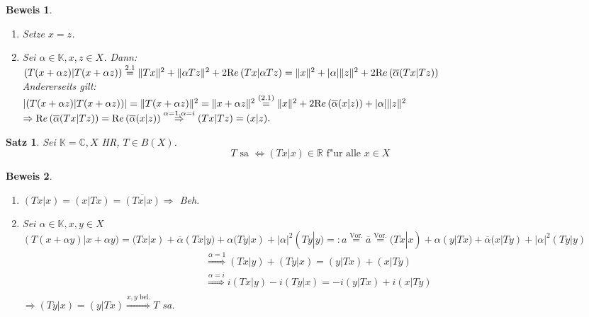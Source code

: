 \documentclass[a4paper,11pt]{book}
\newcommand{\R}{{\mathbb R}}
\newcommand{\C}{{\mathbb C}}
\newcommand{\K}{{\mathbb K}}
\newcommand{\re}{\ensuremath{\text Re}\,}
\newtheorem{Sa}[Def]{Satz}
\theoremstyle{nonumberplain}
\newtheorem{Bew}{Beweis}
\begin{document}
\begin{Bew}
\begin{enumerate}
\item["` $\Leftarrow$ "´] Setze $x = z$.

\item["` $\Rightarrow$ "´] Sei $\alpha \in \K, x,z \in X$. Dann:\\
$(T(x+\alpha z)|T(x+\alpha z)) \stackrel{2.1}{=} \|Tx\|^2 + \|\alpha Tz\|^2 + 2 \re (Tx|\alpha Tz) = \|x\|^2 + |\alpha| \|z\|^2 + 2 \re (\overline{\alpha}(Tx|Tz))$\\
Andererseits gilt:\\
$|(T(x+\alpha z)|T(x+\alpha z))| = \|T(x+\alpha z)\|^2 = \|x+\alpha z\|^2 \stackrel{(2.1)}{=} \|x\|^2 + 2 \re (\overline{\alpha}(x|z)) + |\alpha| \|z\|^2$\\
$\Rightarrow \re(\overline{\alpha}(Tx|Tz)) = \re(\overline{\alpha}(x|z)) \stackrel{\alpha=1,\alpha=i}{\Rightarrow} (Tx|Tz) = (x|z).$
\end{enumerate}
\end{Bew}


\begin{Sa}
Sei $\K = \C, X$ HR, $T \in B(X)$.
\[
T \text{ sa } \Leftrightarrow (Tx|x) \in \R \text{ f"ur alle } x \in X
\]
\end{Sa}

\begin{Bew}
\begin{enumerate}
\item["` $\Rightarrow$ "´] $(Tx|x) = (x|Tx) = \overline{(Tx|x)} \Rightarrow$ Beh.

\item["` $\Leftarrow$ "´] Sei $\alpha \in \K, x,y \in X$\\
$(T(x+\alpha y)|x+\alpha y) = (Tx|x) + \overline{\alpha} (Tx|y) + \alpha (Ty|x) + |\alpha|^2(Ty|y) =: a \stackrel{\text{Vor.}}{=} \overline{a} \stackrel{\text{Vor.}}{=} (Tx|x) + \alpha(y|Tx) + \overline{\alpha}(x|Ty) + |\alpha|^2(Ty|y)$
\begin{eqnarray}
\stackrel{\alpha = 1}{\Rightarrow} (Tx|y) + (Ty|x) = (y|Tx) + (x|Ty) \\
\stackrel{\alpha = i}{\Rightarrow} i(Tx|y) - i(Ty|x) = -i(y|Tx) + i(x|Ty) \\
\end{eqnarray}
$\Rightarrow (Ty|x) = (y|Tx) \stackrel{x,y \text{ bel.}}{\Rightarrow} T$ sa.
\end{enumerate}
\end{Bew}
\end{document}
